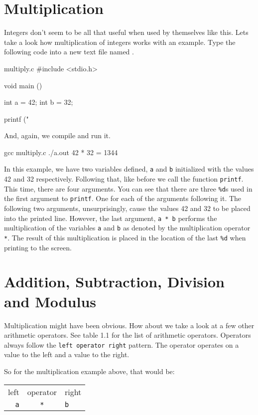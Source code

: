 \section{Multiplication}

Integers don't seem to be all that useful when used by themselves like this.
Lets take a look how multiplication of integers works with an example. Type
the following code into a new text file named .

\begin{code}{multiply.c}
#include <stdio.h>

void main ()
{
    int a = 42;
    int b = 32;

    printf ("%
}
\end{code}

And, again, we compile and run it.

\begin{Terminal}
gcc multiply.c
./a.out
42 * 32 = 1344
\end{Terminal}

In this example, we have two variables defined, \verb|a| and \verb|b|
initialized with the values 42 and 32 respectively. Following that, like before
we call the function \verb|printf|. This time, there are four arguments. You can
see that there are three \verb|%d|s used in the first argument to \verb|printf|.
One for each of the arguments following it. The following two arguments,
unsurprisingly, cause the values 42 and 32 to be placed into the printed line.
However, the last argument, \verb|a * b| performs the multiplication of the
variables \verb|a| and \verb|b| as denoted by the multiplication operator
\verb|*|. The result of this multiplication is placed in the location of the
last \verb|%d| when printing to the screen.

\section{Addition, Subtraction, Division and Modulus}

Multiplication might have been obvious. How about we take a look at a few other
arithmetic operators. See table 1.1 for the list of arithmetic operators.
Operators always follow the \verb|left operator right| pattern. The operator
operates on a value to the left and a value to the right.

So for the multiplication example above, that would be:

\begin{center}
\begin{tabular}{r c l}
left & operator & right \\
\verb|a| & \verb|*| & \verb|b| \\
\end{tabular}
\end{center}

